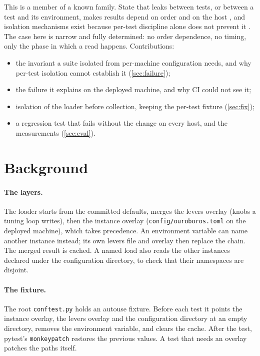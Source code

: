 \documentclass[11pt]{article}
\theoremstyle{plain}
\theoremstyle{definition}
\theoremstyle{remark}
\newcommand{\code}[1]{\texttt{#1}}
\begin{document}
This is a member of a known family. State that leaks between tests, or between a test and its
environment, makes results depend on order and on the host \cite{luo2014flaky,gyori2015polluting},
and isolation mechanisms exist because per-test discipline alone does not prevent it
\cite{bell2014vmvm}. The case here is narrow and fully determined: no order dependence, no
timing, only the phase in which a read happens. Contributions:
\begin{itemize}
  \item the invariant a suite isolated from per-machine configuration needs, and why per-test
        isolation cannot establish it (\cref{sec:failure});
  \item the failure it explains on the deployed machine, and why CI could not see it;
  \item isolation of the loader before collection, keeping the per-test fixture
        (\cref{sec:fix});
  \item a regression test that fails without the change on every host, and the measurements
        (\cref{sec:eval}).
\end{itemize}

\section{Background}
\paragraph{The layers.} The loader starts from the committed defaults, merges the levers overlay
(knobs a tuning loop writes), then the instance overlay (\code{config/ouroboros.toml} on the
deployed machine), which takes precedence. An environment variable can name another instance
instead; its own levers file and overlay then replace the chain. The merged result is cached. A
named load also reads the other instances declared under the configuration directory, to check
that their namespaces are disjoint.

\paragraph{The fixture.} The root \code{conftest.py} holds an autouse fixture. Before each test it
points the instance overlay, the levers overlay and the configuration directory at an empty
directory, removes the environment variable, and clears the cache. After the test, pytest's
\code{monkeypatch} restores the previous values. A test that needs an overlay patches the paths
itself.
\end{document}
